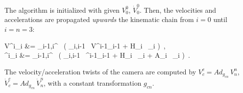 \begin{algorithm}
\label{alg:forward_propagation}

The algorithm is initialized with given $V^{0}_{0}$, $\dot{V}^{0}_{0}$.
%
%
%
%
%
%
%
Then, the velocities and accelerations are propagated \textit{upwards} the kinematic chain from $i=0$ until $i=n=3$:
%
\begin{flalign}
V^{i}_{i} &= \Omega_{i-1,i}^ \, ( \Phi_{i,i-1} \, V^{i-1}_{i-1} + H_{i} \, _{i} ) \,, \label{eq:upwards_prop1} \\
%
^{i}_{i} &= \Omega_{i-1,i}^ \, ( \Phi_{i,i-1} \, ^{i-1}_{i-1} + H_{i} \, _{i} + A_{i} \, _{i} ) \,.
\label{eq:upwards_prop2}
\end{flalign}
%
%
The velocity/acceleration twists of the camera are computed by $V^c_{c} = Ad_{g_{cn}} \, V^{n}_{n}$, $\dot{V}^c_{c} = Ad_{g_{cn}} \, \dot{V}^{n}_{n}$, with a constant transformation $g_{cn}$.
%
%

\end{algorithm}
